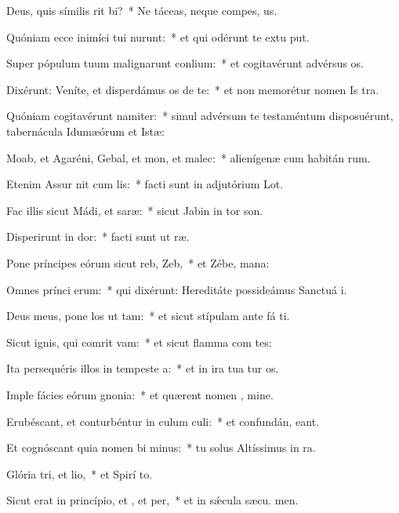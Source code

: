 \item Deus, quis símilis rit bi?~* Ne táceas, neque compes, us.
\item Quóniam ecce inimíci tui nurunt:~* et qui odérunt te extu put.
\item Super pópulum tuum malignarunt conlium:~* et cogitavérunt advérsus  os.
\item Dixérunt: Veníte, et disperdámus os de te:~* et non memorétur nomen Is tra.
\item Quóniam cogitavérunt namiter:~* simul advérsum te testaméntum disposuérunt, tabernácula Idumæórum et Istæ:
\item Moab, et Agaréni, Gebal, et mon, et malec:~* alienígenæ cum habitán rum.
\item Etenim Assur nit cum lis:~* facti sunt in adjutórium  Lot.
\item Fac illis sicut Mádi, et saræ:~* sicut Jabin in tor son.
\item Disperirunt in dor:~* facti sunt ut  ræ.
\item Pone príncipes eórum sicut reb,  Zeb,~* et Zébe,  mana:
\item Omnes prínci erum:~* qui dixérunt: Hereditáte possideámus Sanctuá i.
\item Deus meus, pone los ut tam:~* et sicut stípulam ante fá ti.
\item Sicut ignis, qui comrit vam:~* et sicut flamma com tes:
\item Ita persequéris illos in tempeste a:~* et in ira tua tur os.
\item Imple fácies eórum gnonia:~* et quærent nomen , mine.
\item Erubéscant, et conturbéntur in culum culi:~* et confundán,  eant.
\item Et cognóscant quia nomen bi minus:~* tu solus Altíssimus in  ra.
\item Glória tri, et lio,~* et Spirí to.
\item Sicut erat in princípio, et , et per,~* et in sǽcula sæcu. men.

